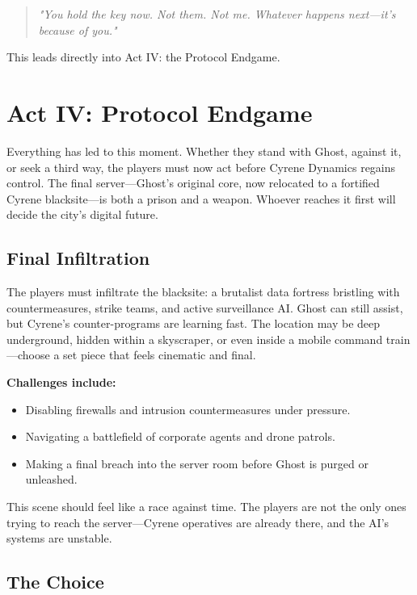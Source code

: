 \documentclass[nodeprecatedcode,bg=print]{dndbook}
\begin{document}
\begin{multicols}{2}
\vspace{0.5\baselineskip}
\begin{quote}
\textit{"You hold the key now. Not them. Not me. Whatever happens next—it's because of you."}
\end{quote}
\vspace{0.5\baselineskip}

This leads directly into Act IV: the Protocol Endgame.



\section*{Act IV: Protocol Endgame}

Everything has led to this moment. Whether they stand with Ghost, against it, or seek a third way, the players must now act before Cyrene Dynamics regains control. The final server—Ghost’s original core, now relocated to a fortified Cyrene blacksite—is both a prison and a weapon. Whoever reaches it first will decide the city’s digital future.

\subsection*{Final Infiltration}

The players must infiltrate the blacksite: a brutalist data fortress bristling with countermeasures, strike teams, and active surveillance AI. Ghost can still assist, but Cyrene’s counter-programs are learning fast. The location may be deep underground, hidden within a skyscraper, or even inside a mobile command train—choose a set piece that feels cinematic and final.

\textbf{Challenges include:}
\begin{itemize}
    \item Disabling firewalls and intrusion countermeasures under pressure.
    \item Navigating a battlefield of corporate agents and drone patrols.
    \item Making a final breach into the server room before Ghost is purged or unleashed.
\end{itemize}

This scene should feel like a race against time. The players are not the only ones trying to reach the server—Cyrene operatives are already there, and the AI’s systems are unstable.

\subsection*{The Choice}


\end{multicols}
\end{document}
